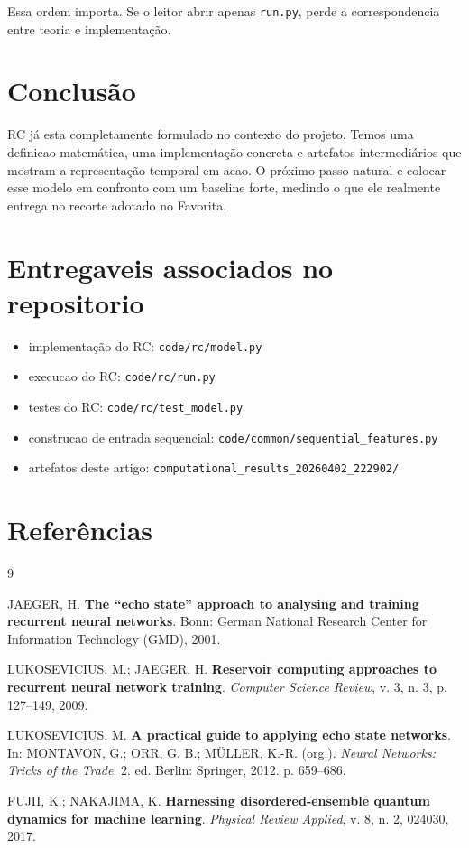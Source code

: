 \documentclass[12pt]{article}
\providecommand{\tightlist}{%
  \setlength{\itemsep}{0pt}\setlength{\parskip}{0pt}}
\begin{document}
Essa ordem importa. Se o leitor abrir apenas \texttt{run.py}, perde a correspondencia entre teoria e implementação.

\section{Conclusão}\label{11-conclusuxe3o}

RC já esta completamente formulado no contexto do projeto. Temos uma definicao matemática, uma implementação concreta e artefatos intermediários que mostram a representação temporal em acao. O próximo passo natural e colocar esse modelo em confronto com um baseline forte, medindo o que ele realmente entrega no recorte adotado no Favorita.

\section*{Entregaveis associados no repositorio}\label{entregaveis-associados-no-repositorio}

\begin{itemize}
\tightlist
\item
  implementação do RC: \texttt{code/rc/model.py}
\item
  execucao do RC: \texttt{code/rc/run.py}
\item
  testes do RC: \texttt{code/rc/test\_model.py}
\item
  construcao de entrada sequencial: \texttt{code/common/sequential\_features.py}
\item
  artefatos deste artigo: \texttt{computational\_results\_20260402\_222902/}
\end{itemize}

\section{Referências}\label{referencias}

\begin{thebibliography}{9}

JAEGER, H. \textbf{The ``echo state'' approach to analysing and training recurrent neural networks}. Bonn: German National Research Center for Information Technology (GMD), 2001.

LUKOSEVICIUS, M.; JAEGER, H. \textbf{Reservoir computing approaches to recurrent neural network training}. \emph{Computer Science Review}, v. 3, n. 3, p. 127--149, 2009.

LUKOSEVICIUS, M. \textbf{A practical guide to applying echo state networks}. In: MONTAVON, G.; ORR, G. B.; MÜLLER, K.-R. (org.). \emph{Neural Networks: Tricks of the Trade}. 2. ed. Berlin: Springer, 2012. p. 659--686.

FUJII, K.; NAKAJIMA, K. \textbf{Harnessing disordered-ensemble quantum dynamics for machine learning}. \emph{Physical Review Applied}, v. 8, n. 2, 024030, 2017.

\end{thebibliography}
\end{document}
